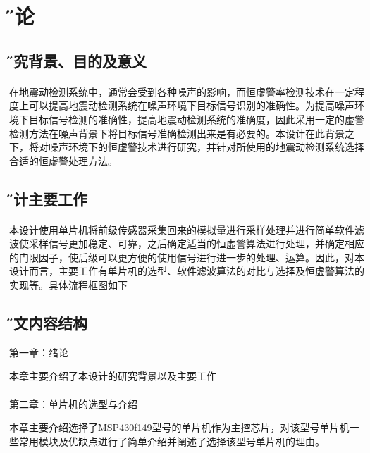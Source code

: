\documentclass[12pt]{article} %
\newcommand{\sihao}{\fontsize{14pt}{\baselineskip}\selectfont}%
\newcommand{\xiaosanhao}{\fontsize{15pt}{\baselineskip}\selectfont}    %
\begin{document}
\renewcommand{\contentsname}{\centerline{ \sihao \H 目\quad 录}}
  \tableofcontents 
    \newpage
  
     
 \section{\xiaosanhao \H 绪论}  
  
 	 \subsection{\H 研究背景、目的及意义}
 	 \paragraph{ \quad} 在地震动检测系统中，通常会受到各种噪声的影响，而恒虚警率检测技术在一定程度上可以提高地震动检测系统在噪声环境下目标信号识别的准确性。为提高噪声环境下目标信号检测的准确性，提高地震动检测系统的准确度，因此采用一定的虚警检测方法在噪声背景下将目标信号准确检测出来是有必要的。本设计在此背景之下，将对噪声环境下的恒虚警技术进行研究，并针对所使用的地震动检测系统选择合适的恒虚警处理方法。
 	 
 	 
 	 \subsection{\H 设计主要工作}
 	 \paragraph{ \quad} 本设计使用单片机将前级传感器采集回来的模拟量进行采样处理并进行简单软件滤波使采样信号更加稳定、可靠，之后确定适当的恒虚警算法进行处理，并确定相应的门限因子，使后级可以更方便的使用信号进行进一步的处理、运算。因此，对本设计而言，主要工作有单片机的选型、软件滤波算法的对比与选择及恒虚警算法的实现等。具体流程框图如下
 	 
 	 
 	  \subsection{\H 论文内容结构}
        \quad \quad 第一章：绪论
         \par 本章主要介绍了本设计的研究背景以及主要工作
         \paragraph{ \quad} 第二章：单片机的选型与介绍
          \par 本章主要介绍选择了MSP430f149型号的单片机作为主控芯片，对该型号单片机一些常用模块及优缺点进行了简单介绍并阐述了选择该型号单片机的理由。
\end{document}
